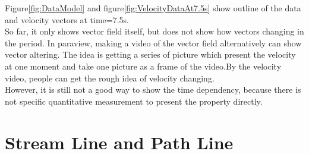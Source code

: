 \documentclass[
     11pt,         %
     a4paper,      %
     oneside,
     ]{article}
\begin{document}
	Figure\ref{fig:DataModel} and figure\ref{fig:VelocityDataAt7.5s} show outline of the data and velocity vectors at time=7.5s.\\
	So far, it only shows vector field itself, but does not show how vectors changing in the period. In paraview, making a video of the vector field alternatively can show vector altering. The idea is getting a series of picture which present the velocity at one moment and take one picture as a frame of the video.By the velocity video, people can get the rough idea of velocity changing.\\
	However, it is still not a good way to show the time dependency, because there is not specific quantitative measurement to present the property directly. 
	
	\section{Stream Line and Path Line}
	\label{sec:Streamline and pathline}
\end{document}
